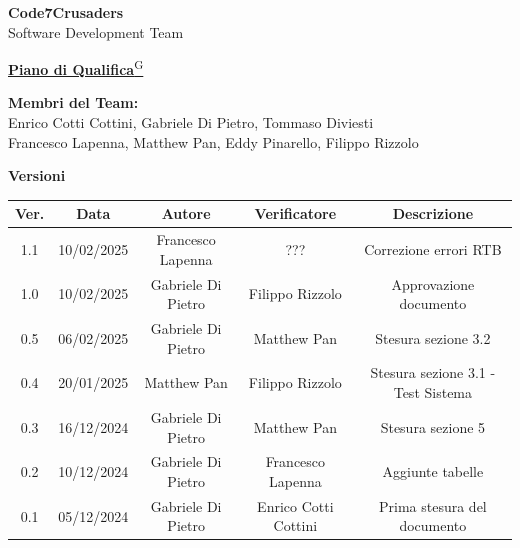 \documentclass{article}
\begin{document}
\begin{titlepage}
    {\Huge \textbf{Code7Crusaders}}\\
    \vspace{0.5cm}
    {\Large Software Development Team}\\
    \vspace{2cm}
    
    {\large \href{https://code7crusaders.github.io/docs/RTB/documentazione_interna/glossario.html#piano-di-progetto}{\textbf{Piano di Qualifica}\textsuperscript{G}}}\\
    \vspace{5cm}
    
    
    \textbf{Membri del Team:}\\
    Enrico Cotti Cottini, Gabriele Di Pietro, Tommaso Diviesti \\
    Francesco Lapenna, Matthew Pan, Eddy Pinarello, Filippo Rizzolo \\
    \vspace{0.5cm}
    
    \vspace{1cm}
\end{titlepage}



\begin{table}[h!]
\centering
\textbf{Versioni} \\ %
\vspace{2mm} %
\begin{tabular}{|c|c|c|c|c|}
    \hline
    \textbf{Ver.} & \textbf{Data} & \textbf{Autore} & \textbf{Verificatore} & \textbf{Descrizione} \\
    \hline
    1.1 & 10/02/2025 & Francesco Lapenna & ??? & Correzione errori RTB \\
    1.0 & 10/02/2025 & Gabriele Di Pietro & Filippo Rizzolo & Approvazione documento \\
    0.5 & 06/02/2025 & Gabriele Di Pietro & Matthew Pan & Stesura sezione 3.2 \\
    0.4 & 20/01/2025 & Matthew Pan & Filippo Rizzolo & Stesura sezione 3.1 - Test Sistema \\
    0.3 & 16/12/2024 & Gabriele Di Pietro & Matthew Pan & Stesura sezione 5 \\
    0.2 & 10/12/2024 & Gabriele Di Pietro & Francesco Lapenna & Aggiunte tabelle \\
    0.1 & 05/12/2024 & Gabriele Di Pietro & Enrico Cotti Cottini & Prima stesura del documento \\  
    \hline
\end{tabular}
\label{tab:versioni}
\end{table}
\newpage
\end{document}
